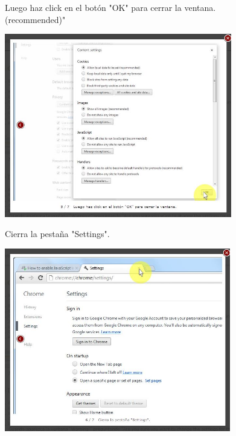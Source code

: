 \documentclass[11pt]{article} %
\begin{document}
\begin{figure}
\begin{center}
\begin{center}
Luego haz click en el botón "OK" para cerrar la ventana. (recommended)"
\end{center}

\includegraphics[height=8cm, width=8 cm] {chrome 05.jpg}

\begin{center}
Cierra la pestaña "Settings".
\end{center}

\includegraphics[height=8cm, width=8 cm] {chrome 06.jpg}



\end{center}
\end{figure}
\end{document}
